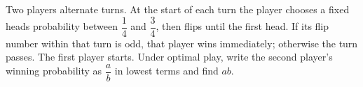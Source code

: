 Two players alternate turns. At the start of each turn the player chooses a fixed heads probability between $\dfrac{1}{4}$ and $\dfrac{3}{4}$, then flips until the first head. If its flip number within that turn is odd, that player wins immediately; otherwise the turn passes. The first player starts. Under optimal play, write the second player's winning probability as $\dfrac{a}{b}$ in lowest terms and find $ab$.
